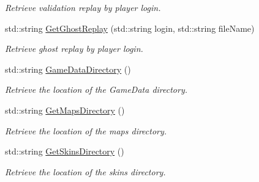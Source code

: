 \begin{DoxyCompactItemize}
\begin{DoxyCompactList}\small\item\em Retrieve validation replay by player login. \end{DoxyCompactList}\item 
std\-::string \hyperlink{classMethods_a517117fc33a06aaef7d1147635e93af4}{Get\-Ghost\-Replay} (std\-::string login, std\-::string file\-Name)
\begin{DoxyCompactList}\small\item\em Retrieve ghost replay by player login. \end{DoxyCompactList}\item 
\hypertarget{classMethods_ae3222ad3237a4871fca7e18ae9c55793}{std\-::string \hyperlink{classMethods_ae3222ad3237a4871fca7e18ae9c55793}{Game\-Data\-Directory} ()}\label{classMethods_ae3222ad3237a4871fca7e18ae9c55793}

\begin{DoxyCompactList}\small\item\em Retrieve the location of the Game\-Data directory. \end{DoxyCompactList}\item 
\hypertarget{classMethods_a261a73ca3361f05b03a69d06e72e19cf}{std\-::string \hyperlink{classMethods_a261a73ca3361f05b03a69d06e72e19cf}{Get\-Maps\-Directory} ()}\label{classMethods_a261a73ca3361f05b03a69d06e72e19cf}

\begin{DoxyCompactList}\small\item\em Retrieve the location of the maps directory. \end{DoxyCompactList}\item 
\hypertarget{classMethods_a839ff140e340c0be9411fce27763e96e}{std\-::string \hyperlink{classMethods_a839ff140e340c0be9411fce27763e96e}{Get\-Skins\-Directory} ()}\label{classMethods_a839ff140e340c0be9411fce27763e96e}

\begin{DoxyCompactList}\small\item\em Retrieve the location of the skins directory. \end{DoxyCompactList}\end{DoxyCompactItemize}
